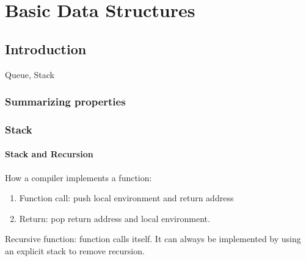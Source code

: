 \chapter{Basic Data Structures}


\section{Introduction}
Queue, Stack


\subsection{Summarizing properties}
\subsection{Stack}
\subsubsection{Stack and Recursion}
How a compiler implements a function:
\begin{enumerate}
\item Function call: push local environment and return address
\item Return: pop return address and local environment. 
\end{enumerate}

Recursive function: function calls itself. It can always be implemented by using an explicit stack to remove recursion. 
